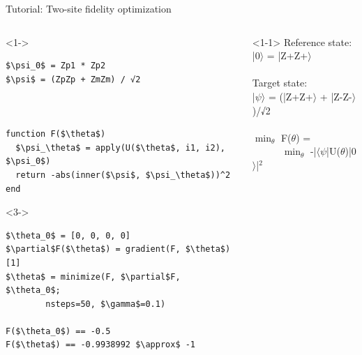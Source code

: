 \begin{frame}[fragile]{Tutorial: Two-site fidelity optimization}

\begin{columns}

\begin{column}{5cm}

\begin{onlyenv}<1->
\begin{lstlisting}[language=JuliaLocal, style=julia, mathescape, basicstyle=\small]
$\psi_0$ = Zp1 * Zp2
$\psi$ = (ZpZp + ZmZm) / √2



function F($\theta$)
  $\psi_\theta$ = apply(U($\theta$, i1, i2), $\psi_0$)
  return -abs(inner($\psi$, $\psi_\theta$))^2
end
\end{lstlisting}
\end{onlyenv}

\begin{onlyenv}<3->
\begin{lstlisting}[language=JuliaLocal, style=julia, mathescape, basicstyle=\small]
$\theta_0$ = [0, 0, 0, 0]
$\partial$F($\theta$) = gradient(F, $\theta$)[1]
$\theta$ = minimize(F, $\partial$F, $\theta_0$;
        nsteps=50, $\gamma$=0.1)

F($\theta_0$) == -0.5
F($\theta$) == -0.9938992 $\approx$ -1
\end{lstlisting}
\end{onlyenv}

\end{column}

\begin{column}{5cm}

\begin{onlyenv}<1-1>
Reference state: \\
|0$\rangle$ = |Z+Z+$\rangle$ \\
~\\
Target state: \\
|$\psi\rangle$ = (|Z+Z+$\rangle$ + |Z-Z-$\rangle$)/√2 \\
~\\
$\min_{\theta}$ F($\theta$) = \\
\ \ \ \ \ \ $\min_{\theta}$ -|$\langle\psi$|U($\theta$)|0$\rangle$|$^2$
\end{onlyenv}


\end{column}
\end{columns}
\end{frame}
